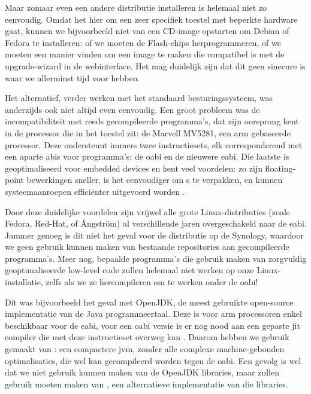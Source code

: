 Maar zomaar even een andere distributie installeren is helemaal niet zo eenvoudig. Omdat het hier om een zeer specifiek toestel met beperkte hardware gaat, kunnen we bijvoorbeeld niet van een CD-image opstarten om Debian of Fedora te installeren: of we moeten de Flash-chips herprogrammeren, of we moeten een manier vinden om een image te maken die compatibel is met de upgrade-wizard in de webinterface. Het mag duidelijk zijn dat dit geen sinecure is waar we allerminst tijd voor hebben.

Het alternatief, verder werken met het standaard besturingssysteem, was anderzijds ook niet altijd even eenvoudig. Een groot probleem was de incompatibiliteit met reeds gecompileerde programma's, dat zijn oorsprong kent in de processor die in het toestel zit: de Marvell MV5281, een \ac{arm} gebaseerde processor. Deze ondersteunt immers twee instructiesets, elk corresponderend met een aparte \acp{abi} voor programma's: de \ac{oabi} en de nieuwere \ac{eabi}. Die laatste is geoptimaliseerd voor embedded devices en kent veel voordelen: zo zijn floating-point bewerkingen sneller, is het eenvoudiger om s te verpakken, en kunnen systeemaanroepen efficiënter uitgevoerd worden \citep{linuxfordevices:eabi}.

Door deze duidelijke voordelen zijn vrijwel alle grote Linux-distributies (zoals Fedora, Red-Hat, of Ångström) al verschillende jaren overgeschakeld naar de \ac{eabi}. Jammer genoeg is dit niet het geval voor de distributie op de Synology, waardoor we geen gebruik kunnen maken van bestaande repositories aan gecompileerde programma's. Meer nog, bepaalde programma's die gebruik maken van zorgvuldig geoptimaliseerde low-level code zullen helemaal niet werken op onze Linux-installatie, zelfs als we ze hercompileren om te werken onder de \ac{oabi}!

Dit was bijvoorbeeld het geval met OpenJDK, de meest gebruikte open-source implementatie van de Java programmeertaal. Deze is voor \ac{arm} processoren enkel beschikbaar voor de \ac{eabi}, voor een \ac{oabi} versie is er nog nood aan een gepaste \ac{jit} compiler die met deze instructieset overweg kan \citep{synology:java}. Daarom hebben we gebruik gemaakt van : een compactere \ac{jvm}, zonder alle complexe machine-gebonden optimalisaties, die wel kan gecompileerd worden tegen de \ac{oabi}. Een gevolg is wel dat we niet gebruik kunnen maken van de OpenJDK libraries, maar zullen gebruik moeten maken van , een alternatieve implementatie van die libraries.

